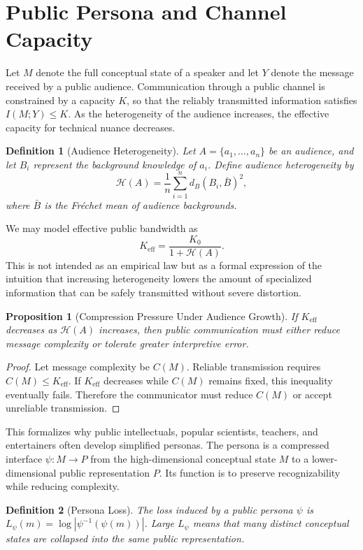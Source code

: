 \documentclass[11pt]{article}
\theoremstyle{plain}
\newtheorem{definition}{Definition}[section]
\newtheorem{proposition}{Proposition}[section]
\begin{document}
\section{Public Persona and Channel Capacity}

Let $M$ denote the full conceptual state of a speaker and let $Y$ denote the message received by a public audience. Communication through a public channel is constrained by a capacity $K$, so that the reliably transmitted information satisfies $I(M;Y) \leq K$. As the heterogeneity of the audience increases, the effective capacity for technical nuance decreases.

\begin{definition}[Audience Heterogeneity]
Let $A = \{a_1,\ldots,a_n\}$ be an audience, and let $B_i$ represent the background knowledge of $a_i$. Define audience heterogeneity by
\[
\mathcal{H}(A) = \frac{1}{n}\sum_{i=1}^n d_B(B_i, \bar B)^2,
\]
where $\bar B$ is the Fréchet mean of audience backgrounds.
\end{definition}

We may model effective public bandwidth as
\[
K_{\mathrm{eff}} = \frac{K_0}{1 + \mathcal{H}(A)}.
\]
This is not intended as an empirical law but as a formal expression of the intuition that increasing heterogeneity lowers the amount of specialized information that can be safely transmitted without severe distortion.

\begin{proposition}[Compression Pressure Under Audience Growth]
If $K_{\mathrm{eff}}$ decreases as $\mathcal{H}(A)$ increases, then public communication must either reduce message complexity or tolerate greater interpretive error.
\end{proposition}
\begin{proof}
Let message complexity be $C(M)$. Reliable transmission requires $C(M) \leq K_{\mathrm{eff}}$. If $K_{\mathrm{eff}}$ decreases while $C(M)$ remains fixed, this inequality eventually fails. Therefore the communicator must reduce $C(M)$ or accept unreliable transmission.
\end{proof}

This formalizes why public intellectuals, popular scientists, teachers, and entertainers often develop simplified personas. The persona is a compressed interface $\psi : M \to P$ from the high-dimensional conceptual state $M$ to a lower-dimensional public representation $P$. Its function is to preserve recognizability while reducing complexity.

\begin{definition}[Persona Loss]
The loss induced by a public persona $\psi$ is $L_\psi(m) = \log |\psi^{-1}(\psi(m))|$. Large $L_\psi$ means that many distinct conceptual states are collapsed into the same public representation.
\end{definition}
\end{document}

